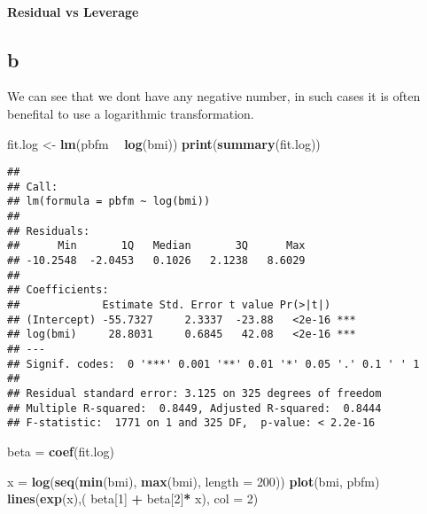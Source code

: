 \documentclass[
]{article}
\newenvironment{Shaded}{\begin{snugshade}}{\end{snugshade}}
\newcommand{\DataTypeTok}[1]{\textcolor[rgb]{0.13,0.29,0.53}{#1}}
\newcommand{\DecValTok}[1]{\textcolor[rgb]{0.00,0.00,0.81}{#1}}
\newcommand{\KeywordTok}[1]{\textcolor[rgb]{0.13,0.29,0.53}{\textbf{#1}}}
\newcommand{\NormalTok}[1]{#1}
\newcommand{\OperatorTok}[1]{\textcolor[rgb]{0.81,0.36,0.00}{\textbf{#1}}}
\newcommand{\StringTok}[1]{\textcolor[rgb]{0.31,0.60,0.02}{#1}}
\begin{document}
\hypertarget{residual-vs-leverage}{%
\paragraph{Residual vs Leverage}\label{residual-vs-leverage}}

\hypertarget{b}{%
\subsection{b}\label{b}}

We can see that we dont have any negative number, in such cases it is
often benefital to use a logarithmic transformation.

\begin{Shaded}
\begin{Highlighting}[]
\NormalTok{fit.log <-}\StringTok{ }\KeywordTok{lm}\NormalTok{(pbfm }\OperatorTok{~}\StringTok{ }\KeywordTok{log}\NormalTok{(bmi))}
\KeywordTok{print}\NormalTok{(}\KeywordTok{summary}\NormalTok{(fit.log))}
\end{Highlighting}
\end{Shaded}

\begin{verbatim}
## 
## Call:
## lm(formula = pbfm ~ log(bmi))
## 
## Residuals:
##      Min       1Q   Median       3Q      Max 
## -10.2548  -2.0453   0.1026   2.1238   8.6029 
## 
## Coefficients:
##             Estimate Std. Error t value Pr(>|t|)    
## (Intercept) -55.7327     2.3337  -23.88   <2e-16 ***
## log(bmi)     28.8031     0.6845   42.08   <2e-16 ***
## ---
## Signif. codes:  0 '***' 0.001 '**' 0.01 '*' 0.05 '.' 0.1 ' ' 1
## 
## Residual standard error: 3.125 on 325 degrees of freedom
## Multiple R-squared:  0.8449, Adjusted R-squared:  0.8444 
## F-statistic:  1771 on 1 and 325 DF,  p-value: < 2.2e-16
\end{verbatim}

\begin{Shaded}
\begin{Highlighting}[]
\NormalTok{beta =}\StringTok{ }\KeywordTok{coef}\NormalTok{(fit.log)}

\NormalTok{x =}\StringTok{ }\KeywordTok{log}\NormalTok{(}\KeywordTok{seq}\NormalTok{(}\KeywordTok{min}\NormalTok{(bmi), }\KeywordTok{max}\NormalTok{(bmi), }\DataTypeTok{length =} \DecValTok{200}\NormalTok{))}
\KeywordTok{plot}\NormalTok{(bmi, pbfm)}
\KeywordTok{lines}\NormalTok{(}\KeywordTok{exp}\NormalTok{(x),( beta[}\DecValTok{1}\NormalTok{] }\OperatorTok{+}\StringTok{ }\NormalTok{beta[}\DecValTok{2}\NormalTok{]}\OperatorTok{*}\StringTok{ }\NormalTok{x), }\DataTypeTok{col =} \DecValTok{2}\NormalTok{) }
\end{Highlighting}
\end{Shaded}
\end{document}
